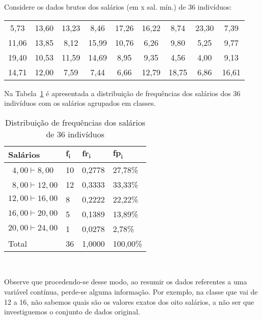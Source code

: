 \documentclass[11pt,fleqn]{book} %
\begin{document}
\begin{example} \label{exemp:distfreqquant2} 

	Considere os dados brutos dos salários (em x sal. mín.) de 36 indivíduos:
	
	\begin{center} \label{dadosbrutossalarios}
	\begin{tabular}{c c c c c c c c c}
	\hline
	5,73  &  13,60  &  13,23  &  8,46  &  17,26  &  16,22  &  8,74  &  23,30  &  7,39 \\
	11,06  &  13,85  &  8,12  &  15,99  &  10,76  &  6,26  &  9,80  &  5,25  &  9,77 \\
	19,40  &  10,53  &  11,59  &  14,69  &  8,95  &  9,35  &  4,56  &  4,00  &  9,13 \\
	14,71  &  12,00  &  7,59  &  7,44  &  6,66  &  12,79  &  18,75  &  6,86  &  16,61 \\
	\hline
	\end{tabular}
	\end{center}
	
	Na Tabela~\ref{tab:distfreqquant2} é apresentada a distribuição de frequências dos salários dos 36 indivíduos 
	com os salários	agrupados em classes.
	
	
	\begin{table}[h]
	\caption{Distribuição de frequências dos salários de 36 indivíduos}
	\label{tab:distfreqquant2} 
	\vspace{0.1cm}
	\centering
	\begin{tabular}{l l l l}
	\toprule
	\textbf{Salários} & $\bm{f_i}$ & $\bm{fr_i}$ & $\bm{fp_i}$ \\
	\midrule
	\,\,\,$4,00 \vdash 8,00$  &  10  &  0,2778  &  27,78\% \\
	\,\,\,$8,00 \vdash 12,00$  &  12  &  0,3333  &  33,33\% \\
	$12,00 \vdash 16,00$  &  8  &  0,2222  &  22,22\% \\
	$16,00 \vdash 20,00$  &  5  &  0,1389  &  13,89\% \\
	$20,00 \vdash 24,00$  &  1  &  0,0278  &  2,78\% \\	
	\hline
	Total  &  36  &  1,0000  &  100,00\% \\
	\bottomrule
	\end{tabular} \\
	\end{table}
	
	Observe que procedendo-se desse modo, ao resumir os dados referentes a uma variável contínua, 
	perde-se alguma informação. Por exemplo, na classe que vai de 12 a 16, não sabemos quais são os valores 
	exatos dos oito salários, a não ser que investiguemos o conjunto de dados original.
	
\end{example}
\vspace{0.5cm}
\end{document}
